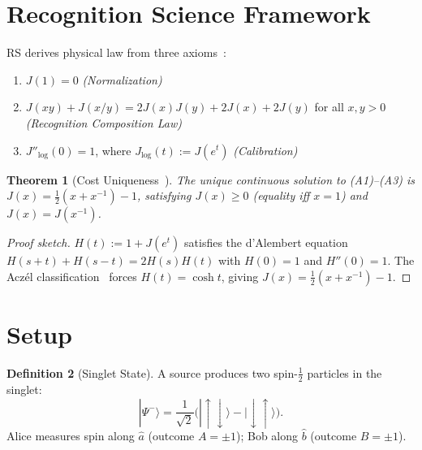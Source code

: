 \documentclass[12pt,a4paper]{article}
\newtheorem{theorem}{Theorem}[section]
\theoremstyle{definition}
\newtheorem{definition}[theorem]{Definition}
\theoremstyle{remark}
\begin{document}
\section{Recognition Science Framework}
\label{sec:framework}

RS derives physical law from three axioms~\cite{RS_Axioms}:
\begin{enumerate}[label=(A\arabic*),nosep]
  \item $J(1) = 0$ \hfill \textit{(Normalization)}
  \item $J(xy) + J(x/y) = 2J(x)J(y) + 2J(x) + 2J(y)$ for all $x,y>0$
  \hfill \textit{(Recognition Composition Law)}
  \item $J''_{\log}(0) = 1$, where $J_{\log}(t) := J(e^t)$
  \hfill \textit{(Calibration)}
\end{enumerate}

\begin{theorem}[Cost Uniqueness~\cite{RS_Axioms}]
\label{thm:J}
The unique continuous solution to (A1)--(A3) is
$J(x) = \tfrac{1}{2}(x + x^{-1}) - 1$, satisfying $J(x) \geq 0$
(equality iff $x = 1$) and $J(x) = J(x^{-1})$.
\end{theorem}

\begin{proof}[Proof sketch]
$H(t) := 1 + J(e^t)$ satisfies the d'Alembert equation
$H(s+t) + H(s-t) = 2H(s)H(t)$ with $H(0)=1$ and $H''(0)=1$.
The Acz\'el classification~\cite{Aczel1966} forces $H(t)=\cosh t$, giving
$J(x) = \tfrac{1}{2}(x+x^{-1})-1$.
\end{proof}

\section{Setup}
\label{sec:setup}

\begin{definition}[Singlet State]
\label{def:singlet}
A source produces two spin-$\frac{1}{2}$ particles in the
singlet:
\begin{equation}
  |\Psi^-\rangle = \frac{1}{\sqrt{2}}
  \bigl(|\!\uparrow\downarrow\rangle
  - |\!\downarrow\uparrow\rangle\bigr).
\end{equation}
Alice measures spin along $\hat{a}$ (outcome $A = \pm 1$);
Bob along $\hat{b}$ (outcome $B = \pm 1$).
\end{definition}
\end{document}
